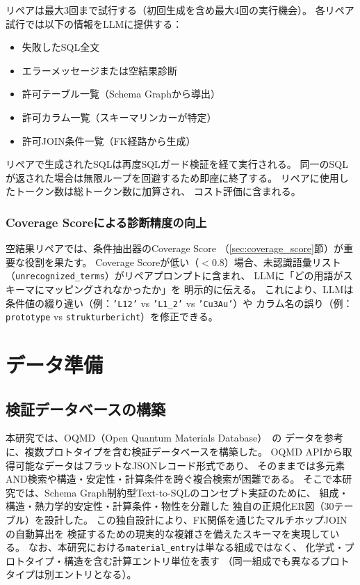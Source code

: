 \documentclass[5p,twocolumn]{elsarticle}
\begin{document}
リペアは最大3回まで試行する（初回生成を含め最大4回の実行機会）。
各リペア試行では以下の情報をLLMに提供する：

\begin{itemize}
  \item 失敗したSQL全文
  \item エラーメッセージまたは空結果診断
  \item 許可テーブル一覧（Schema Graphから導出）
  \item 許可カラム一覧（スキーマリンカーが特定）
  \item 許可JOIN条件一覧（FK経路から生成）
\end{itemize}

リペアで生成されたSQLは再度SQLガード検証を経て実行される。
同一のSQLが返された場合は無限ループを回避するため即座に終了する。
リペアに使用したトークン数は総トークン数に加算され、
コスト評価に含まれる。

\subsubsection{Coverage Scoreによる診断精度の向上}

空結果リペアでは、条件抽出器のCoverage Score
（\ref{sec:coverage_score}節）が重要な役割を果たす。
Coverage Scoreが低い（$<0.8$）場合、未認識語彙リスト
（\texttt{unrecognized\_terms}）がリペアプロンプトに含まれ、
LLMに「どの用語がスキーマにマッピングされなかったか」を
明示的に伝える。
これにより、LLMは条件値の綴り違い（例：\texttt{'L12'} vs
\texttt{'L1\_2'} vs \texttt{'Cu3Au'}）や
カラム名の誤り（例：\texttt{prototype} vs
\texttt{strukturbericht}）を修正できる。

\section{データ準備}
\label{sec:data}

\subsection{検証データベースの構築}

本研究では、OQMD（Open Quantum Materials Database）~\citep{saal2013oqmd}の
データを参考に、複数プロトタイプを含む検証データベースを構築した。
OQMD APIから取得可能なデータはフラットなJSONレコード形式であり、
そのままでは多元素AND検索や構造・安定性・計算条件を跨ぐ複合検索が困難である。
そこで本研究では、Schema Graph制約型Text-to-SQLのコンセプト実証のために、
組成・構造・熱力学的安定性・計算条件・物性を分離した
独自の正規化ER図（30テーブル）を設計した。
この独自設計により、FK関係を通じたマルチホップJOINの自動算出を
検証するための現実的な複雑さを備えたスキーマを実現している。
なお、本研究における\texttt{material\_entry}は単なる組成ではなく、
化学式・プロトタイプ・構造を含む計算エントリ単位を表す
（同一組成でも異なるプロトタイプは別エントリとなる）。
\end{document}
